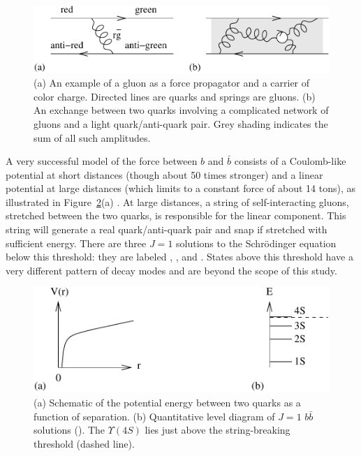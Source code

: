 \documentclass{cornell}
\begin{document}
\begin{figure}[p]
  \begin{center}
    \includegraphics[width=\linewidth]{plots/gluejunk}
  \end{center}
  \caption[Color exchange and the complexity of QCD]{\label{gluejunk} (a)
  An example of a gluon as a force propagator and a carrier of color
  charge.  Directed lines are quarks and springs are gluons.  (b) An
  exchange between two quarks involving a complicated network of
  gluons and a light quark/anti-quark pair.  Grey shading indicates
  the sum of all such amplitudes.}
\end{figure}

A very successful model of the force between $b$ and $\bar{b}$
consists of a Coulomb-like potential at short distances (though about
50 times stronger) and a linear potential at large distances (which
limits to a constant force of about 14 tons), as illustrated in
Figure~\ref{cornellpotential}(a) \cite{cornellpotential}.  At large
distances, a string of self-interacting gluons, stretched between the
two quarks, is responsible for the linear component.  This string will
generate a real quark/anti-quark pair and snap if stretched with
sufficient energy.  There are three $J=1$ solutions to the
Schr\"odinger equation below this threshold: they are labeled \us,
\uss, and \usss.  States above this threshold have a very different
pattern of decay modes and are beyond the scope of this study.

\begin{figure}[p]
  \begin{center}
    \includegraphics[width=0.8\linewidth]{newnewplots/cornellpotential}
  \end{center}
  \caption[Bottomonium potential and energy
  eigenvalues]{\label{cornellpotential} (a) Schematic of the potential
  energy between two quarks as a function of separation.  (b)
  Quantitative level diagram of $J=1$ $b\bar{b}$ solutions (\ups).
  The $\Upsilon(4S)$ lies just above the string-breaking threshold
  (dashed line).}
\end{figure}
\end{document}
